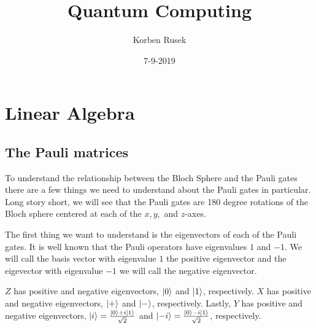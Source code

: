 \documentclass{article}
\author{Korben Rusek}
\title{Quantum Computing}
\date{7-9-2019}
\begin{document}
\maketitle
\newcommand{\gindex}[2]{|#1\!:\!#2|}
\newcommand{\lcm}{\textrm{lcm}}
\newcommand{\irr}{\textrm{irr}}
\newcommand{\sylp}{$Syl_{p}$}
\newcommand{\phnt}[1]{$\phantom{1}^{#1}$}
\newcommand{\gen}[1]{\langle#1\rangle}
\newcommand{\BN}{\mathbb{N}}
\newcommand{\BZ}{\mathbb{Z}}
\newcommand{\BQ}{\mathbb{Q}}
\newcommand{\BR}{\mathbb{R}}
\newcommand{\BC}{\mathbb{C}}
\newcommand{\BF}{\mathbb{F}}
\newcommand{\CF}{\mathcal{F}}
\newcommand{\CQ}{\mathcal{Q}}
\newcommand{\fa}{\mathfrak{a}}
\newcommand{\fb}{\mathfrak{b}}
\newcommand{\fp}{\mathfrak{p}}
\newcommand{\fq}{\mathfrak{q}}
\newcommand{\fm}{\mathfrak{m}}
\newcommand{\FN}{\mathfrak{N}}
\newcommand{\FR}{\mathfrak{R}}
\newcommand{\set}[1]{\{#1\}}
\newcommand{\trv}{\set{1}}
\newcommand{\Aut}{\mathrm{Aut}}
\newcommand{\End}{\mathrm{End}}
\newcommand{\Ker}{\mathrm{Ker}}
\newcommand{\chr}{\mathrm{char}}
\theoremstyle{definition}
\newtheorem{theorem}{Theorem}[section]
\newtheorem{definition}[theorem]{Definition}
\newtheorem{postulate}{Postulate}[section]

\section{Linear Algebra}

\setcounter{subsection}{2}
\subsection{The Pauli matrices}

To understand the relationship between the Bloch Sphere and 
the Pauli gates there are a few things we need to understand
about the Pauli gates in particular. Long story short, we will
see that the Pauli gates are 180 degree rotations of the 
Bloch sphere centered at each of the $x, y,$ and $z$-axes.

The first thing we want to understand is the eigenvectors of
each of the Pauli gates. It is well known that the Pauli 
operators have eigenvalues $1$ and $-1$. We will call the
basis vector with eigenvalue $1$ the positive eigenvector 
and the eigevector with eigenvalue $-1$ we will call the 
negative eigenvector.

$Z$ has positive and negative eigenvectors, $\ket{0}$ and
$\ket{1}$, respectively. $X$ has positive and negative 
eigenvectors, $\ket{+}$ and $\ket{-}$, respectively. Lastly, 
$Y$ has positive and negative eigenvectors,
$\ket{i}=\frac{\ket0 + i\ket1}{\sqrt2}$ and
$\ket{-i}=\frac{\ket0 - i\ket1}{\sqrt2}$, respectively.
\end{document}
